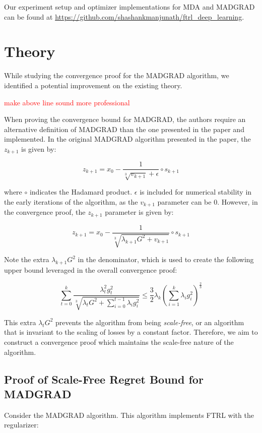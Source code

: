 \documentclass{article}
\newcommand{\todo}[1]{\textcolor{red}{#1}}
\begin{document}
Our experiment setup and optimizer implementations for MDA and MADGRAD can be found at
\url{https://github.com/shashankmanjunath/ftrl_deep_learning}.

\section{Theory}

While studying the convergence proof for the MADGRAD algorithm, we identified a potential improvement on the existing
theory. 

\todo{make above line sound more professional}

When proving the convergence bound for MADGRAD, the authors require an alternative definition of
MADGRAD than the one presented in the paper and implemented. In the original MADGRAD algorithm presented in the paper,
the $z_{k+1}$ is given by:

\[
  z_{k+1} = x_0 - \frac{1}{\sqrt[3]{v_{k+1}} + \epsilon} \circ s_{k+1}
\]

where $\circ$ indicates the Hadamard product. $\epsilon$ is included for numerical stability in the early iterations of
the algorithm, as the $v_{k+1}$ parameter can be 0. However, in the convergence proof, the $z_{k+1}$ parameter is given
by:

\[
  z_{k+1} = x_0 - \frac{1}{\sqrt[3]{\lambda_{k+1}G^2 + v_{k+1}}} \circ s_{k+1}
\]

Note the extra $\lambda_{k+1}G^2$ in the denominator, which is used to create the following upper bound leveraged in the
overall convergence proof:

\[
  \sum\limits_{t=0}^k \frac{\lambda_t^2 g_t^2}{\sqrt[3]{\lambda_t G^2 + \sum\limits_{i=0}^{t-1} \lambda_i g_i^2}} \leq
  \frac{3}{2} \lambda_k \left(\sum\limits_{i=1}^k \lambda_i g_i^2\right)^{\frac{2}{3}}
\]

This extra $\lambda_t G^2$ prevents the algorithm from being \emph{scale-free}, or an algorithm that is invariant to the
scaling of losses by a constant factor. Therefore, we aim to construct a convergence proof which maintains the
scale-free nature of the algorithm.

\subsection{Proof of Scale-Free Regret Bound for MADGRAD}

Consider the MADGRAD algorithm. This algorithm implements FTRL with the regularizer: 
\end{document}
